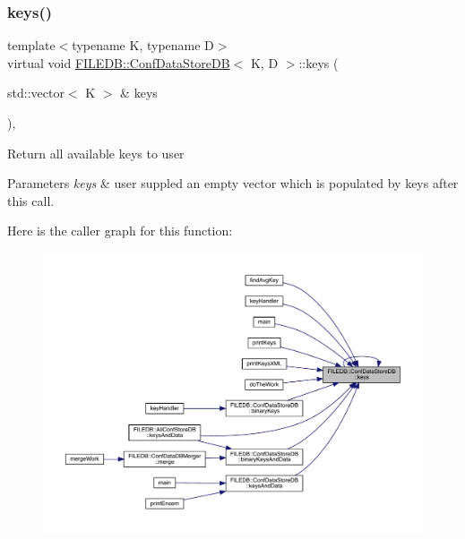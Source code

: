 \subsubsection{\texorpdfstring{keys()}{keys()}\hspace{0.1cm}{\footnotesize\ttfamily [1/2]}}
{\footnotesize\ttfamily template$<$typename K, typename D$>$ \\
virtual void \mbox{\hyperlink{classFILEDB_1_1ConfDataStoreDB}{F\+I\+L\+E\+D\+B\+::\+Conf\+Data\+Store\+DB}}$<$ K, D $>$\+::keys (\begin{DoxyParamCaption}\item[{std\+::vector$<$ K $>$ \&}]{keys }\end{DoxyParamCaption})\hspace{0.3cm}{\ttfamily [inline]}, {\ttfamily [virtual]}}

Return all available keys to user 
\begin{DoxyParams}{Parameters}
{\em keys} & user suppled an empty vector which is populated by keys after this call. \\
\hline
\end{DoxyParams}
Here is the caller graph for this function\+:\nopagebreak
\begin{figure}[H]
\begin{center}
\leavevmode
\includegraphics[width=350pt]{d8/d19/classFILEDB_1_1ConfDataStoreDB_a794e05e3888ab95e0396a196b5a18e65_icgraph}
\end{center}
\end{figure}
\mbox{\label{classFILEDB_1_1ConfDataStoreDB_a794e05e3888ab95e0396a196b5a18e65}} 
